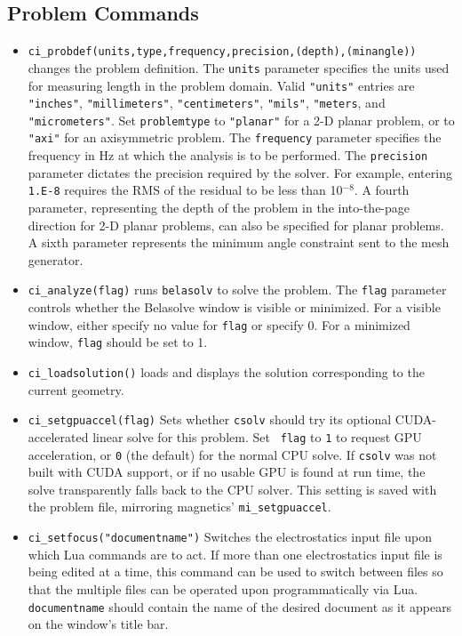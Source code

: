 \subsection{Problem Commands}

\begin{itemize}
\item {\tt ci\_probdef(units,type,frequency,precision,(depth),(minangle))} changes the problem
definition. The \texttt{units} parameter specifies the units used
for measuring length in the problem domain. Valid \texttt{"units"}
entries are
\texttt{"inches"}, \texttt{"millimeters"}, \texttt{"centimeters"},
\texttt{"mils"}, \texttt{"meters}, and \texttt{"micrometers"}. Set
\texttt{problemtype} to \texttt{"planar"} for a 2-D planar problem, or to
\texttt{"axi"} for an axisymmetric problem. The \texttt{frequency} parameter specifies the frequency
in Hz at which the analysis is to be performed. The \texttt{precision} parameter
dictates the precision required by the solver. For example, entering
\texttt{1.E-8} requires the RMS of the residual to be less than 10$^{ - 8}$.
A fourth parameter, representing the depth of the problem in the
into-the-page direction for 2-D planar problems, can also be specified
for planar problems. A sixth parameter represents the minimum angle constraint sent to the mesh generator.

\item {\tt ci\_analyze(flag)} runs \texttt{belasolv} to solve the problem. The
\texttt{flag} parameter controls whether the Belasolve window is visible or
minimized. For a visible window, either specify no value for
\texttt{flag} or specify 0. For a minimized window, \texttt{flag}
should be set to 1.

\item {\tt ci\_loadsolution()} loads and displays the solution corresponding to the
current geometry.

\item{\tt ci\_setgpuaccel(flag)} Sets whether {\tt csolv} should try
its optional CUDA-accelerated linear solve for this problem. Set {\tt
flag} to {\tt 1} to request GPU acceleration, or {\tt 0} (the default)
for the normal CPU solve. If {\tt csolv} was not built with CUDA
support, or if no usable GPU is found at run time, the solve
transparently falls back to the CPU solver. This setting is saved with
the problem file, mirroring magnetics' {\tt mi\_setgpuaccel}.

\item {\tt ci\_setfocus("documentname")} Switches the
electrostatics input file upon which Lua commands are to act. If
more than one electrostatics input file is being edited at a time,
this command can be used to switch between files so that the
multiple files can be operated upon programmatically via Lua. {\tt
documentname} should contain the name of the desired document as
it appears on the window's title bar.


\end{itemize}
